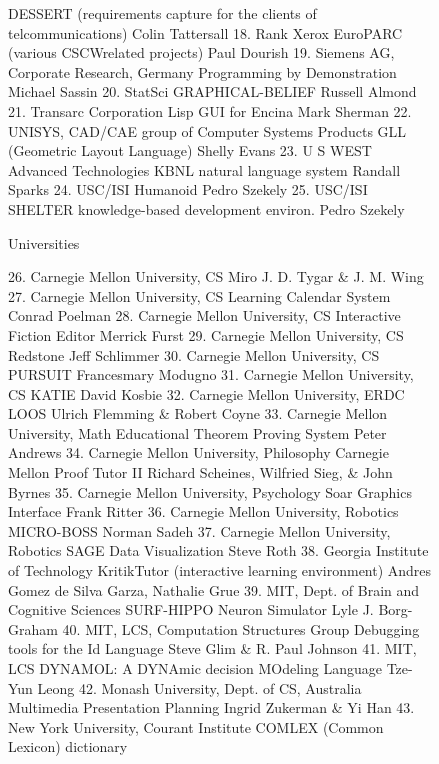 \begin{figure}
\begin{figcol}
      DESSERT (requirements capture for the clients
         of telcommunications)
      Colin Tattersall
18. Rank Xerox EuroPARC
      (various CSCWrelated projects)
      Paul Dourish
19. Siemens AG, Corporate Research, Germany
      Programming by Demonstration
      Michael Sassin
20. StatSci
      GRAPHICAL-BELIEF
      Russell Almond
21. Transarc Corporation
      Lisp GUI for Encina
      Mark Sherman
22. UNISYS, CAD/CAE group of Computer Systems
         Products
      GLL (Geometric Layout Language)
      Shelly Evans
23. U S WEST Advanced Technologies
      KBNL natural language system
      Randall Sparks
24. USC/ISI
      Humanoid
      Pedro Szekely
25. USC/ISI
      SHELTER knowledge-based development environ.
      Pedro Szekely

\newcolumn{}
\begin{b}
Universities
\end{b}
26. Carnegie Mellon University, CS
      Miro
      J. D. Tygar \& J. M. Wing
27. Carnegie Mellon University, CS
      Learning Calendar System
      Conrad Poelman
28. Carnegie Mellon University, CS
      Interactive Fiction Editor
      Merrick Furst
29. Carnegie Mellon University, CS
      Redstone
      Jeff Schlimmer
30. Carnegie Mellon University, CS
      PURSUIT
      Francesmary Modugno
31. Carnegie Mellon University, CS
      KATIE
      David Kosbie
32. Carnegie Mellon University, ERDC
      LOOS
      Ulrich Flemming \& Robert Coyne
33. Carnegie Mellon University, Math
      Educational Theorem Proving System
      Peter Andrews
34. Carnegie Mellon University, Philosophy
      Carnegie Mellon Proof Tutor II
      Richard Scheines, Wilfried Sieg, \& John Byrnes
35. Carnegie Mellon University, Psychology
      Soar Graphics Interface
      Frank Ritter
36. Carnegie Mellon University, Robotics
      MICRO-BOSS
      Norman Sadeh
37. Carnegie Mellon University, Robotics
      SAGE Data Visualization
      Steve Roth
38. Georgia Institute of Technology
      KritikTutor (interactive learning environment)
      Andres Gomez de Silva Garza, Nathalie Grue
39. MIT, Dept. of Brain and Cognitive Sciences
      SURF-HIPPO Neuron Simulator
      Lyle J. Borg-Graham
40. MIT, LCS, Computation Structures Group
      Debugging tools for the Id Language
      Steve Glim \& R. Paul Johnson
41. MIT, LCS
      DYNAMOL: A DYNAmic decision MOdeling
         Language
      Tze-Yun Leong
42. Monash University, Dept. of CS, Australia
      Multimedia Presentation Planning
      Ingrid Zukerman \& Yi Han
43. New York University, Courant Institute
      COMLEX (Common Lexicon) dictionary

\end{figcol}
\end{figure}
